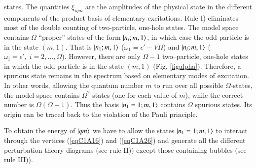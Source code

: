 states. The quantities $\xi_{iqm}$ are the amplitudes of the physical state in the different components of the product basis of elementary excitations. Rule I) eliminates most of the double counting of two-particle, one-hole states. The model space contains $\Omega$ ``proper'' states of the form $|{n_i;m,1} \rangle$,  in which case the odd particle is in the state $(m,1)$. That is $|{n_1;m,1} \rangle$ ($\omega_1=\epsilon'-V\Omega$) and $|{n_i;m,1} \rangle$ ($\omega_i=\epsilon',\; i=2,\dots,\Omega$). However, there are only $\Omega-1$ two--particle, one-hole states in which the odd particle is in the state $(m,1)$ (Fig. \ref{figalpha}). Therefore, a spurious state remains in the spectrum based on elementary modes of excitation. In other words, allowing the quantum number $m$ to run over all possible $\Omega$-states, the  model space contains $\Omega^2$ states (one for each value of $m$), while the correct number is $\Omega(\Omega-1)$. Thus the basis $|{n_1=1; m,1} \rangle$ contains $\Omega$ spurious states. Its origin can be
traced back to the violation of the Pauli principle.


To obtain the energy of $|{qm} \rangle$ we have to allow the states $|{n_1=1;m,1} \rangle$
to interact through the vertices (\ref{eqC1A16}) and (\ref{eqC1A26}) and generate all the different
perturbation theory diagrams (see rule II)) except those containing bubbles
(see rule III)).


